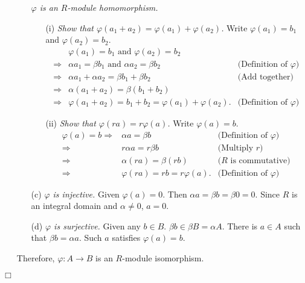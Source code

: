 \documentclass{article}
\begin{document}
\begin{enumerate}
\begin{enumerate}
  \emph{$\varphi$ is an $R$-module homomorphism.}
    \begin{enumerate}
    \item[(i)]
    \emph{Show that $\varphi(a_1+a_2) = \varphi(a_1) + \varphi(a_2)$.}
    Write $\varphi(a_1) = b_1$ and $\varphi(a_2) = b_2$.
    \begin{align*}
    &\varphi(a_1) = b_1 \text{ and } \varphi(a_2) = b_2 \\
    \Longrightarrow&
    \alpha a_1 = \beta b_1 \text{ and } \alpha a_2 = \beta b_2
      &\text{(Definition of $\varphi$)} \\
    \Longrightarrow&
    \alpha a_1 + \alpha a_2 = \beta b_1 + \beta b_2
      &\text{(Add together)} \\
    \Longrightarrow&
    \alpha (a_1 + a_2) = \beta (b_1 + b_2) \\
    \Longrightarrow&
    \varphi(a_1+a_2) = b_1+b_2 = \varphi(a_1) + \varphi(a_2).
      &\text{(Definition of $\varphi$)}
    \end{align*}
    \item[(ii)]
    \emph{Show that $\varphi(ra) = r\varphi(a)$.}
    Write $\varphi(a) = b$.
    \begin{align*}
    \varphi(a) = b
    \Longrightarrow&
    \alpha a = \beta b
      &\text{(Definition of $\varphi$)} \\
    \Longrightarrow&
    r \alpha a = r \beta b
      &\text{(Multiply $r$)} \\
    \Longrightarrow&
    \alpha(ra) = \beta (rb)
      &\text{($R$ is commutative)} \\
    \Longrightarrow&
    \varphi(ra) = rb = r \varphi(a).
      &\text{(Definition of $\varphi$)}
    \end{align*}
    \end{enumerate}
  \item[(c)]
  \emph{$\varphi$ is injective.}
  Given $\varphi(a) = 0$. Then $\alpha a = \beta b = \beta 0 = 0$.
  Since $R$ is an integral domain and $\alpha \neq 0$, $a = 0$.
  \item[(d)]
  \emph{$\varphi$ is surjective.}
  Given any $b \in B$. $\beta b \in \beta B = \alpha A$.
  There is $a \in A$ such that $\beta b = \alpha a$.
  Such $a$ satisfies $\varphi(a) = b$.
  \end{enumerate}
  Therefore, $\varphi: A \to B$ is an $R$-module isomorphism.
\end{enumerate}
$\Box$ \\\\
\end{document}
